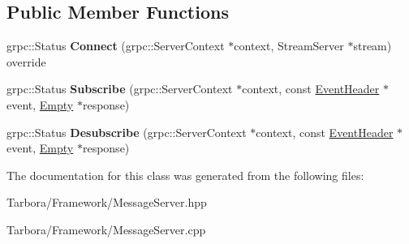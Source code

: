 \subsection*{Public Member Functions}
\begin{DoxyCompactItemize}
\item 
\mbox{\label{classTarbora_1_1Server_a337e77edf1fafd3edd98b3db78c48695}} 
grpc\+::\+Status {\bfseries Connect} (grpc\+::\+Server\+Context $\ast$context, Stream\+Server $\ast$stream) override
\item 
\mbox{\label{classTarbora_1_1Server_a9fc0d2ff34b37dab8d22ce14b64e8a71}} 
grpc\+::\+Status {\bfseries Subscribe} (grpc\+::\+Server\+Context $\ast$context, const \hyperlink{classtbMessages_1_1EventHeader}{Event\+Header} $\ast$event, \hyperlink{classtbMessages_1_1Empty}{Empty} $\ast$response)
\item 
\mbox{\label{classTarbora_1_1Server_afb4a7c1dad88605e62412cdcb0367afc}} 
grpc\+::\+Status {\bfseries Desubscribe} (grpc\+::\+Server\+Context $\ast$context, const \hyperlink{classtbMessages_1_1EventHeader}{Event\+Header} $\ast$event, \hyperlink{classtbMessages_1_1Empty}{Empty} $\ast$response)
\end{DoxyCompactItemize}


The documentation for this class was generated from the following files\+:\begin{DoxyCompactItemize}
\item 
Tarbora/\+Framework/Message\+Server.\+hpp\item 
Tarbora/\+Framework/Message\+Server.\+cpp\end{DoxyCompactItemize}
